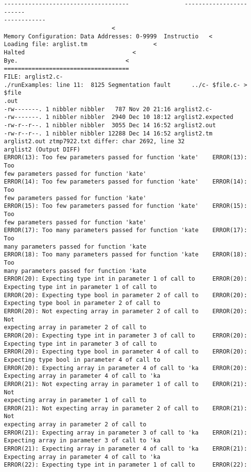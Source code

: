 \documentclass[12pt]{book}
\begin{document}
\begin{lstlisting}
------------------------------------                ------------------------
------------
                               <
Memory Configuration: Data Addresses: 0-9999  Instructio   <
Loading file: arglist.tm                   <
Halted                               <
Bye.                               <
====================================
FILE: arglist2.c-
./runExamples: line 11:  8125 Segmentation fault      ../c- $file.c- > $file
.out
-rw-------. 1 nibbler nibbler   787 Nov 20 21:16 arglist2.c-
-rw-------. 1 nibbler nibbler  2940 Dec 10 18:12 arglist2.expected
-rw-r--r--. 1 nibbler nibbler  3055 Dec 14 16:52 arglist2.out
-rw-r--r--. 1 nibbler nibbler 12288 Dec 14 16:52 arglist2.tm
arglist2.out ztmp7922.txt differ: char 2692, line 32
arglist2 (Output DIFF)
ERROR(13): Too few parameters passed for function 'kate'    ERROR(13): Too 
few parameters passed for function 'kate'
ERROR(14): Too few parameters passed for function 'kate'    ERROR(14): Too 
few parameters passed for function 'kate'
ERROR(15): Too few parameters passed for function 'kate'    ERROR(15): Too 
few parameters passed for function 'kate'
ERROR(17): Too many parameters passed for function 'kate    ERROR(17): Too 
many parameters passed for function 'kate
ERROR(18): Too many parameters passed for function 'kate    ERROR(18): Too 
many parameters passed for function 'kate
ERROR(20): Expecting type int in parameter 1 of call to     ERROR(20): 
Expecting type int in parameter 1 of call to 
ERROR(20): Expecting type bool in parameter 2 of call to    ERROR(20): 
Expecting type bool in parameter 2 of call to
ERROR(20): Not expecting array in parameter 2 of call to    ERROR(20): Not 
expecting array in parameter 2 of call to
ERROR(20): Expecting type int in parameter 3 of call to     ERROR(20): 
Expecting type int in parameter 3 of call to 
ERROR(20): Expecting type bool in parameter 4 of call to    ERROR(20): 
Expecting type bool in parameter 4 of call to
ERROR(20): Expecting array in parameter 4 of call to 'ka    ERROR(20): 
Expecting array in parameter 4 of call to 'ka
ERROR(21): Not expecting array in parameter 1 of call to    ERROR(21): Not 
expecting array in parameter 1 of call to
ERROR(21): Not expecting array in parameter 2 of call to    ERROR(21): Not 
expecting array in parameter 2 of call to
ERROR(21): Expecting array in parameter 3 of call to 'ka    ERROR(21): 
Expecting array in parameter 3 of call to 'ka
ERROR(21): Expecting array in parameter 4 of call to 'ka    ERROR(21): 
Expecting array in parameter 4 of call to 'ka
ERROR(22): Expecting type int in parameter 1 of call to     ERROR(22): 

\end{lstlisting}
\end{document}
